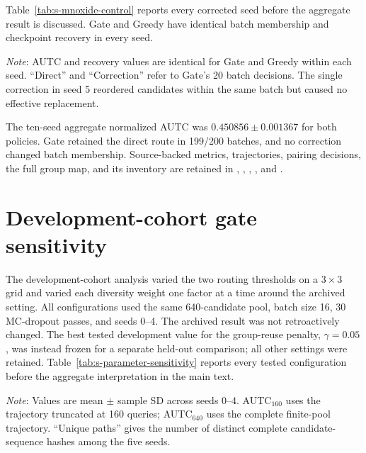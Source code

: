 \documentclass[cmc,article,submit,moreauthors,pdftex]{Definitions/tsp}
\newcommand{\tabnote}[1]{\par\smallskip\noindent\begin{minipage}{\linewidth}\footnotesize\emph{Note}: #1\end{minipage}\par}
\begin{document}
Table~\ref{tab:s-mnoxide-control} reports every corrected seed before the
aggregate result is discussed. Gate and Greedy have identical batch membership
and checkpoint recovery in every seed.

\begin{table}[H]
\centering
\caption{Per-seed Materials Project Mn-oxide control for Gate and Greedy.}
\label{tab:s-mnoxide-control}
\tablesize{\scriptsize}
\resizebox{\textwidth}{!}{}
\tabnote{AUTC and recovery values are identical for Gate and Greedy within each
seed. ``Direct'' and ``Correction'' refer to Gate's 20 batch decisions. The
single correction in seed 5 reordered candidates within the same batch but
caused no effective replacement.}
\end{table}

The ten-seed aggregate normalized AUTC was
$0.450856\pm0.001367$ for both policies. Gate retained the direct route in
199/200 batches, and no correction changed batch membership. Source-backed
metrics, trajectories, pairing decisions, the full group map, and its inventory
are retained in ,
,
,
, and
.

\section{Development-cohort gate sensitivity}

The development-cohort analysis varied the two routing thresholds on a
$3\times3$ grid and varied each diversity weight one factor at a time around
the archived setting. All configurations used the same 640-candidate pool,
batch size 16, 30 MC-dropout passes, and seeds 0--4. The archived result was not
retroactively changed. The best tested development value for the group-reuse
penalty, $\gamma=0.05$, was instead frozen for a separate held-out comparison;
all other settings were retained. Table~\ref{tab:s-parameter-sensitivity}
reports every tested configuration before the aggregate interpretation in the
main text.

\begin{table}[H]
\centering
\caption{Complete development-cohort gate-parameter sensitivity.}
\label{tab:s-parameter-sensitivity}
\tablesize{\scriptsize}
\resizebox{\textwidth}{!}{}
\tabnote{Values are mean $\pm$ sample SD across seeds 0--4. AUTC$_{160}$
uses the trajectory truncated at 160 queries; AUTC$_{640}$ uses the complete
finite-pool trajectory. ``Unique paths'' gives the number of distinct complete
candidate-sequence hashes among the five seeds.}
\end{table}
\end{document}
